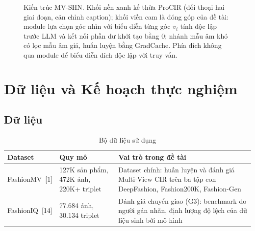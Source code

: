 \documentclass[a4paper]{article}
\begin{document}
\begin{figure}[t]
\caption{Kiến trúc MV-SHN. Khối nền xanh kế thừa ProCIR (đối thoại hai giai đoạn, căn chỉnh caption); khối viền cam là đóng góp của đề tài: module lựa chọn góc nhìn với biểu diễn từng góc $v_i$ tính độc lập trước LLM và kết nối phần dư khởi tạo bằng 0; nhánh mẫu âm khó có lọc mẫu âm giả, huấn luyện bằng GradCache. Phía đích không qua module để biểu diễn đích độc lập với truy vấn.}\label{fig:arch}
\end{figure}

\section{Dữ liệu và Kế hoạch thực nghiệm}

\subsection{Dữ liệu}

\begin{table}[h]
\centering
\caption{Bộ dữ liệu sử dụng}\label{tab:data}
\begin{tabularx}{\textwidth}{L{2.3cm}L{3.3cm}Y}
\toprule
\textbf{Dataset} & \textbf{Quy mô} & \textbf{Vai trò trong đề tài}\\
\midrule
FashionMV~[1] & 127K sản phẩm, 472K ảnh, 220K+ triplet & Dataset chính: huấn luyện và đánh giá Multi-View CIR trên ba tập con DeepFashion, Fashion200K, Fashion-Gen\\
FashionIQ~[14] & 77.684 ảnh, 30.134 triplet & Đánh giá chuyển giao (G3): benchmark do người gán nhãn, định lượng độ lệch của dữ liệu sinh bởi mô hình\\
\bottomrule
\end{tabularx}
\end{table}
\end{document}
